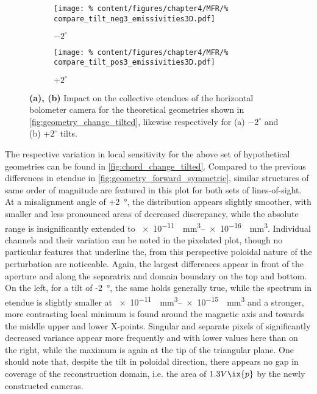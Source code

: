 %
            \begin{figure}[t]%
                \centering%
                \begin{subfigure}{0.47\textwidth}%
                    \texttt{[image: \%
                        content/figures/chapter4/MFR/\%
                        compare\_tilt\_neg3\_emissivities3D.pdf]}%
                    \caption{$-2^{\circ}$}%
                \end{subfigure}%
                \hfill%
                \begin{subfigure}{0.47\textwidth}%
                    \texttt{[image: \%
                        content/figures/chapter4/MFR/\%
                        compare\_tilt\_pos3\_emissivities3D.pdf]}%
                    \caption{$+2^{\circ}$}%
                \end{subfigure}%
                \caption{\textbf{(a), (b)} Impact on the collective etendues of the horizontal bolometer camera for the theoretical geometries shown in \cref{fig:geometry_change_tilted}, likewise respectively for (a) $-2^{\circ}$ and (b) $+2^{\circ}$ tilts.}\label{fig:emiss_change_tilted}%
            \end{figure}%
%
            The respective variation in local sensitivity for the above set of hypothetical geometries can be found in \cref{fig:chord_change_tilted}. Compared to the previous differences in etendue in \cref{fig:geometry_forward_symmetric}, similar structures of same order of magnitude are featured in this plot for both sets of lines-of-sight. At a misalignment angle of +\SI{2}{\degree}, the distribution appears slightly smoother, with smaller and less pronounced areas of decreased discrepancy, while the absolute range is insignificantly extended to \SIrange[per-mode=reciprocal]{e-11}{e-16}{\per\cubic\milli\meter}. Individual channels and their variation can be noted in the pixelated plot, though no particular features that underline the, from this perspective poloidal nature of the perturbation are noticeable. Again, the largest differences appear in front of the aperture and along the separatrix and domain boundary on the top and bottom. On the left, for a tilt of -\SI{2}{\degree}, the same holds generally true, while the spectrum in etendue is slightly smaller at \SIrange[per-mode=reciprocal]{e-11}{e-15}{\per\cubic\milli\meter} and a stronger, more contrasting local minimum is found around the magnetic axis and towards the middle upper and lower X-points. Singular and separate pixels of significantly decreased variance appear more frequently and with lower values here than on the right, while the maximum is again at the tip of the triangular plane. One should note that, despite the tilt in poloidal direction, there appears no gap in coverage of the reconstruction domain, i.e. the area of $1.3V\ix{p}$ by the newly constructed cameras.\\%
